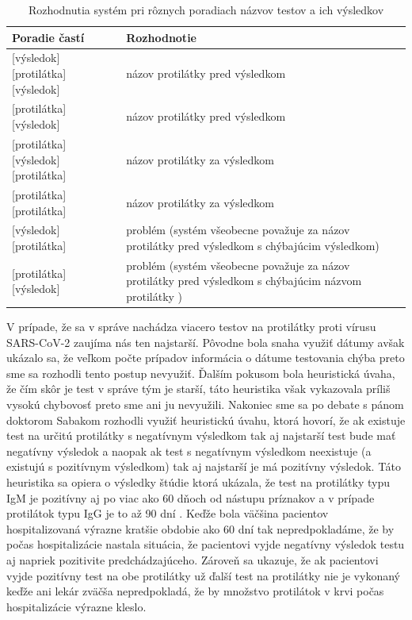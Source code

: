\begin{table}[]
	\caption[Rozhodia systému pri testoch]{Rozhodnutia systém pri rôznych poradiach názvov testov a ich výsledkov}
	\label{tab:proti}
	\begin{tabular}{|p{8cm}|p{6.7cm}|}
		\hline
		\textbf{Poradie častí}                          & \textbf{Rozhodnotie}                                                                                             \\ \hline
		[protilátka] [výsledok] [protilátka] [výsledok] & názov protilátky pred výsledkom                                                                        \\ \hline
		[protilátka] [protilátka] [výsledok]            & názov protilátky pred výsledkom                                                                        \\ \hline
		[výsledok] [protilátka] [výsledok] [protilátka] & názov protilátky za výsledkom                                                                          \\ \hline
		[výsledok] [protilátka] [protilátka]            & názov protilátky za výsledkom                                                                          \\ \hline
		[protilátka] [výsledok] [protilátka]            & problém (systém všeobecne považuje za názov protilátky pred výsledkom s chýbajúcim výsledkom)          \\ \hline
		[výsledok] [protilátka] [výsledok]              & problém (systém všeobecne považuje za názov protilátky pred výsledkom s chýbajúcim názvom protilátky ) \\ \hline
	\end{tabular}
\end{table}

V prípade, že sa v správe nachádza viacero testov na protilátky proti vírusu SARS-CoV-2 zaujíma nás ten najstarší. Pôvodne bola snaha využiť dátumy avšak ukázalo sa, že veľkom počte prípadov informácia o dátume testovania chýba preto sme sa rozhodli tento postup nevyužiť. Ďalším pokusom bola heuristická úvaha, že čím skôr je test v správe tým je starší, táto heuristika však vykazovala príliš vysokú chybovosť preto sme ani ju nevyužili. Nakoniec sme sa po debate s pánom doktorom Sabakom rozhodli využiť heuristickú úvahu, ktorá hovorí, že ak existuje test na určitú protilátky s negatívnym výsledkom tak aj najstarší test bude mať negatívny výsledok a naopak ak test s negatívnym výsledkom neexistuje (a existujú s pozitívnym výsledkom) tak aj najstarší je má pozitívny výsledok. Táto heuristika sa opiera o výsledky štúdie ktorá ukázala, že test na protilátky typu IgM je pozitívny aj po viac ako 60 dňoch od nástupu príznakov a v prípade protilátok typu IgG je to až 90 dní \cite{antibodies}. Keďže bola väčšina pacientov hospitalizovaná výrazne kratšie obdobie ako 60 dní tak nepredpokladáme, že by počas hospitalizácie nastala situácia, že pacientovi vyjde negatívny výsledok testu aj napriek pozitivite predchádzajúceho. Zároveň sa ukazuje, že ak pacientovi vyjde pozitívny test na obe protilátky už ďalší test na protilátky nie je vykonaný keďže ani lekár zväčša nepredpokladá, že by množstvo protilátok v krvi počas hospitalizácie výrazne kleslo.

